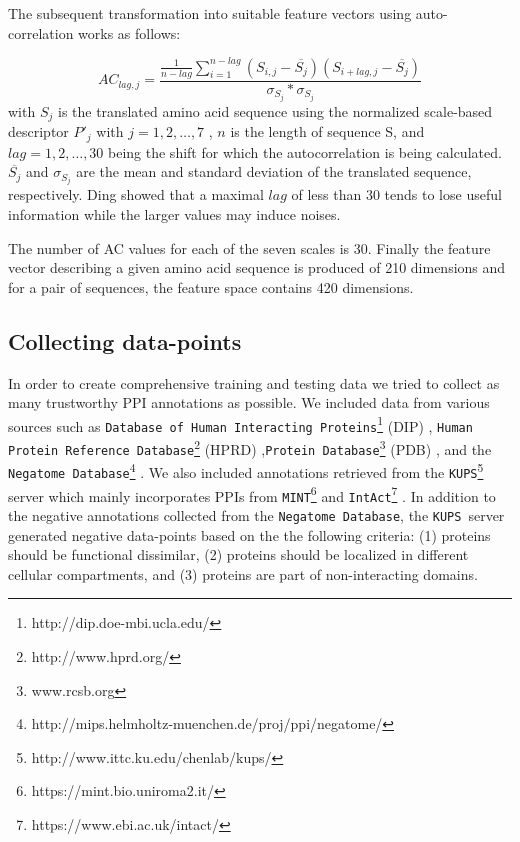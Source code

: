 \documentclass[preprint,3p,times,twocolumn]{elsarticle}
\newcommand{\nega}{\texttt{Negatome Database}}
\newcommand{\kups}{\texttt{KUPS}}
\begin{document}
The subsequent transformation into suitable feature vectors using auto-correlation works as follows:

\begin{equation}
AC_{lag, j} = \frac {\frac{1}{n-lag} \sum^{n-lag}_{i=1} ( S_{i,j} - \overline{S_j}) (S_{i+lag,j} - \overline{S_j})} { \sigma_{S_j} * \sigma_{S_j} }
\end{equation}
with $S_j$ is the translated amino acid sequence using the normalized scale-based descriptor $P'_j$ with $j = 1, 2, \dots, 7$ , $n$ is the length of sequence S, and $lag = 1, 2, \dots, 30$  being the shift for which the autocorrelation is being calculated. $\overline{S_j}$ and  $\sigma_{S_j}$ are the mean and standard deviation of the translated sequence, respectively.
Ding \cite{Ding:2016} showed that a maximal $lag$ of less than 30 tends to lose useful information while the larger values may induce noises.

The number of AC values for each of the seven scales is 30. Finally the feature vector describing a given amino acid sequence is produced of 210 dimensions and for a pair of sequences, the feature space contains 420 dimensions.


\subsection{Collecting data-points}
In order to create comprehensive training and testing data we tried to collect as many trustworthy PPI annotations as possible. We included data from various sources such as \texttt{Database of Human Interacting Proteins}\footnote{http://dip.doe-mbi.ucla.edu/} (DIP) \cite{Salwinski:2004}, \texttt{Human Protein Reference Database}\footnote{http://www.hprd.org/} (HPRD) \cite{Keshava_Prasad:2009},\texttt{Protein Database}\footnote{www.rcsb.org} (PDB) \cite{Berman:2000}, and the \nega\footnote{http://mips.helmholtz-muenchen.de/proj/ppi/negatome/} \cite{Blohm:2014}. We also included annotations retrieved from the \kups \footnote{http://www.ittc.ku.edu/chenlab/kups/}   server \cite{Chen:2011} which mainly incorporates PPIs from \texttt{MINT}\footnote{https://mint.bio.uniroma2.it/} \cite{Licata:2012} and \texttt{IntAct}\footnote{https://www.ebi.ac.uk/intact/} \cite{Orchard:2014}. In addition to the negative annotations collected from the \nega, the \kups\ server generated negative data-points based on the the following criteria: (1) proteins should be functional dissimilar, (2) proteins should be localized in different cellular compartments, and (3) proteins are part of non-interacting domains.
\end{document}
